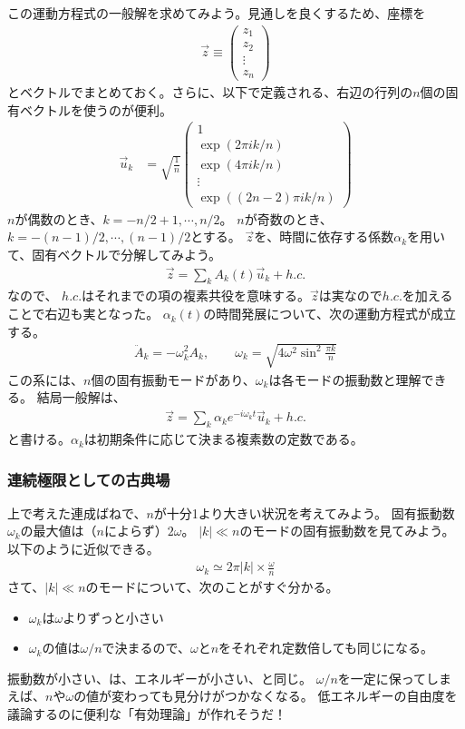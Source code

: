 \documentclass[10pt,a4paper]{jarticle}
\begin{document}
この運動方程式の一般解を求めてみよう。見通しを良くするため、座標を
\begin{align}
\vec z \equiv
\left(\begin{array}{c}
z_1 \\
z_2 \\
\vdots \\
z_n
\end{array}\right)
\end{align}
とベクトルでまとめておく。さらに、以下で定義される、右辺の行列の$n$個の固有ベクトルを使うのが便利。
\begin{align}
\vec u_k &= 
\sqrt{\frac{1}{n}} \left(\begin{array}{c}
1 \\
\exp(2\pi ik/n) \\
\exp(4\pi ik/n) \\
\vdots \\
\exp((2n-2)\pi ik/n)
\end{array}\right) \label{eq:eigenvector connected HO}
\end{align}
$n$が偶数のとき、$k = -n/2+1, \cdots, n/2$。
$n$が奇数のとき、$k = -(n-1)/2, \cdots, (n-1)/2$とする。
$\vec z$を、時間に依存する係数$\alpha_k$を用いて、固有ベクトルで分解してみよう。
\begin{align}
\vec z = \sum_k A_k(t) \vec u_k + h.c.
\end{align}なので、
$h.c.$はそれまでの項の複素共役を意味する。$\vec z$は実なので$h.c.$を加えることで右辺も実となった。
$\alpha_k(t)$の時間発展について、次の運動方程式が成立する。
\begin{align}
\ddot A_k = -\omega_k^2 A_k, \qquad
\omega_k = \sqrt{4 \omega^2 \sin^2 \frac{\pi k}{n}}
\end{align}
この系には、$n$個の固有振動モードがあり、$\omega_k$は各モードの振動数と理解できる。
%
結局一般解は、
\begin{align}
\vec z = \sum_k \alpha_k e^{-i\omega_k t} \vec u_k+ h.c.
\end{align}
と書ける。$\alpha_k$は初期条件に応じて決まる複素数の定数である。

\subsubsection{連続極限としての古典場}
上で考えた連成ばねで、$n$が十分1より大きい状況を考えてみよう。
固有振動数$\omega_k$の最大値は（$n$によらず）$2\omega$。
$|k| \ll n$のモードの固有振動数を見てみよう。以下のように近似できる。
\begin{align}
\omega_k \simeq 2\pi |k| \times \frac{\omega}{n}
\end{align}
さて、$|k| \ll n$のモードについて、次のことがすぐ分かる。
\begin{itemize}
\item $\omega_k$は$\omega$よりずっと小さい
\item $\omega_k$の値は$\omega/n$で決まるので、$\omega$と$n$をそれぞれ定数倍しても同じになる。
\end{itemize}
振動数が小さい、は、エネルギーが小さい、と同じ。
$\omega/n$を一定に保ってしまえば、$n$や$\omega$の値が変わっても見分けがつかなくなる。
低エネルギーの自由度を議論するのに便利な「有効理論」が作れそうだ！
\end{document}

